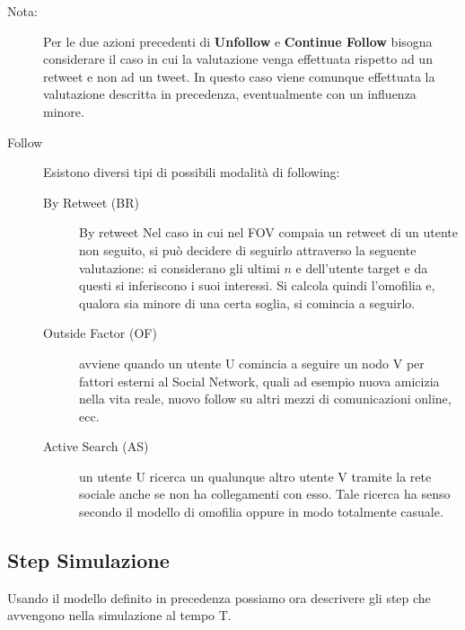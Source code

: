 \begin{description}
  \item[Nota:] Per le due azioni precedenti di \textbf{Unfollow} e
  \textbf{Continue Follow} bisogna considerare il caso in cui
  la valutazione venga effettuata rispetto ad un retweet e non ad
  un tweet. In questo caso viene comunque effettuata la valutazione
  descritta in precedenza, eventualmente con un influenza minore. 
  
  \item[Follow] Esistono diversi tipi di possibili modalit\`a di 
  following:
    \begin{description}
      \item[By Retweet (BR)] By retweet 
      Nel caso in cui nel FOV compaia un retweet di un utente non 
      seguito, si pu\`o decidere di seguirlo attraverso la seguente 
      valutazione: si considerano gli ultimi $n$ \twt{} e \retwt{} 
      dell'utente target e da questi si inferiscono i suoi interessi.
      Si calcola quindi l'omofilia e, qualora sia minore di una 
      certa soglia, si comincia a seguirlo.  
      \item[Outside Factor (OF)] avviene quando un utente U comincia
      a seguire un nodo V per fattori esterni al Social Network, 
      quali ad esempio nuova amicizia nella vita reale, nuovo
      follow su altri mezzi di comunicazioni online, ecc.
      
      \item[Active Search (AS)] un utente U ricerca un qualunque 
      altro utente V tramite la rete sociale anche se non ha 
      collegamenti con esso. Tale ricerca ha senso secondo il
      modello di omofilia oppure in modo totalmente casuale.
            
    \end{description}
\end{description}

\subsection{Step Simulazione}
\label{subsec:step}

Usando il modello definito in precedenza possiamo ora descrivere gli 
step che avvengono nella simulazione al tempo T.

